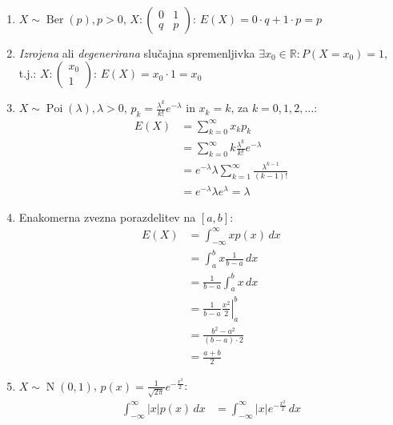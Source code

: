 \documentclass[12pt]{book}
\theoremstyle{definition}
\theoremstyle{plain}
\theoremstyle{plain}
\theoremstyle{plain}
\theoremstyle{remark}
\begin{document}
\begin{zgled}
    ~
    
    \begin{enumerate}
        \item $X \sim \operatorname{Ber}(p), p >0$, $X:\left(\begin{array}{cc} 0 & 1 \\ q & p \end{array}\right)$: $E(X)=0 \cdot q+1 \cdot p=p$
        \item \emph{Izrojena} ali \emph{degenerirana} slučajna spremenljivka $\exists x_0 \in \mathbb{R}: P\left(X=x_0\right)=1$, t.j.: $X:\left(\begin{array}{c} x_0 \\ 1 \end{array}\right)$: $E(X)=x_0 \cdot 1=x_0$
        \item $X \sim \operatorname{Poi}(\lambda), \lambda >0$, $p_k=\frac{\lambda^k}{k !}  e^{-\lambda}$ in $x_k = k$, za $k=0, 1, 2, \ldots$:
        $$
        \begin{aligned}
            E(X)&=\sum_{k=0}^{\infty} x_k p_k \\
            &=\sum_{k=0}^{\infty} k \frac{\lambda^k}{k !}  e^{-\lambda} \\
            &=e^{-\lambda} \lambda \sum_{k=1}^{\infty} \frac{\lambda^{k-1}}{(k-1) !} \\ 
            &= e^{-\lambda} \lambda e^\lambda=\lambda
        \end{aligned}
        $$
        \item Enakomerna zvezna porazdelitev na $[a, b]$:
        $$
        \begin{aligned}
            E(X)&=\int_{-\infty}^{\infty} x p(x) \, d x \\
            &=\int_a^b x \frac{1}{b-a} \, d x \\
            &=\frac{1}{b-a} \int_a^b x \,d x \\
            &=\left.\frac{1}{b-a} \frac{x^2}{2}\right|_a ^b \\
            &=\frac{b^2-a^2}{(b-a) \cdot 2} \\
            &=\frac{a+b}{2}
        \end{aligned}
        $$
        \item $X \sim \operatorname{N}(0,1)$, $p(x)=\frac{1}{\sqrt{2 \pi}} e^{-\frac{x^2}{2}}$:
        \begin{align*}
            \int_{-\infty}^{\infty}|x| p(x) \, d x &= \int_{-\infty}^{\infty}|x| e^{-\frac{x^2}{2}} \, d x \\

\end{align*}
\end{enumerate}
\end{zgled}
\end{document}
